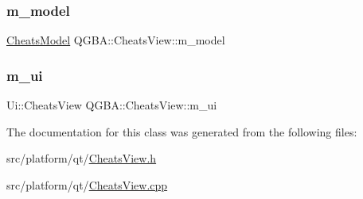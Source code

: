 \mbox{\label{class_q_g_b_a_1_1_cheats_view_a63b79a28b00e130233f9315cf516ad6f}} 
\subsubsection{\texorpdfstring{m\+\_\+model}{m\_model}}
{\footnotesize\ttfamily \mbox{\hyperlink{class_q_g_b_a_1_1_cheats_model}{Cheats\+Model}} Q\+G\+B\+A\+::\+Cheats\+View\+::m\+\_\+model\hspace{0.3cm}{\ttfamily [private]}}

\mbox{\label{class_q_g_b_a_1_1_cheats_view_a86f2446f94a5233312615d6463e01fb6}} 
\subsubsection{\texorpdfstring{m\+\_\+ui}{m\_ui}}
{\footnotesize\ttfamily Ui\+::\+Cheats\+View Q\+G\+B\+A\+::\+Cheats\+View\+::m\+\_\+ui\hspace{0.3cm}{\ttfamily [private]}}



The documentation for this class was generated from the following files\+:\begin{DoxyCompactItemize}
\item 
src/platform/qt/\mbox{\hyperlink{_cheats_view_8h}{Cheats\+View.\+h}}\item 
src/platform/qt/\mbox{\hyperlink{_cheats_view_8cpp}{Cheats\+View.\+cpp}}\end{DoxyCompactItemize}
